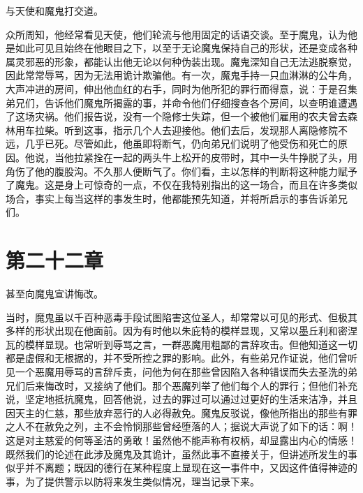 与天使和魔鬼打交道。\par

众所周知，他经常看见天使，他们轮流与他用固定的话语交谈。至于魔鬼，认为他是如此可见且始终在他眼目之下，以至于无论魔鬼保持自己的形状，还是变成各种属灵邪恶的形象，都能认出他无论以何种伪装出现。魔鬼深知自己无法逃脱察觉，因此常常辱骂，因为无法用诡计欺骗他。有一次，魔鬼手持一只血淋淋的公牛角，大声冲进的房间，伸出他血红的右手，同时为他所犯的罪行而得意，说：于是召集弟兄们，告诉他们魔鬼所揭露的事，并命令他们仔细搜查各个房间，以查明谁遭遇了这场灾祸。他们报告说，没有一个隐修士失踪，但一个被他们雇用的农夫曾去森林用车拉柴。听到这事，指示几个人去迎接他。他们去后，发现那人离隐修院不远，几乎已死。尽管如此，他虽即将断气，仍向弟兄们说明了他受伤和死亡的原因。他说，当他拉紧拴在一起的两头牛上松开的皮带时，其中一头牛挣脱了头，用角伤了他的腹股沟。不久那人便断气了。你们看，主以怎样的判断将这种能力赋予了魔鬼。这是身上可惊奇的一点，不仅在我特别指出的这一场合，而且在许多类似场合，事实上每当这样的事发生时，他都能预先知道，并将所启示的事告诉弟兄们。\par


\section{第二十二章}

甚至向魔鬼宣讲悔改。\par

当时，魔鬼虽以千百种恶毒手段试图陷害这位圣人，却常常以可见的形式、但极其多样的形状出现在他面前。因为有时他以朱庇特的模样显现，又常以墨丘利和密涅瓦的模样显现。也常听到辱骂之言，一群恶魔用粗鄙的言辞攻击。但他知道这一切都是虚假和无根据的，并不受所控之罪的影响。此外，有些弟兄作证说，他们曾听见一个恶魔用辱骂的言辞斥责，问他为何在那些曾因陷入各种错误而失去圣洗的弟兄们后来悔改时，又接纳了他们。那个恶魔列举了他们每个人的罪行；但他们补充说，坚定地抵抗魔鬼，回答他说，过去的罪过可以通过过更好的生活来洁净，并且因天主的仁慈，那些放弃恶行的人必得赦免。魔鬼反驳说，像他所指出的那些有罪之人不在赦免之列，主不会怜悯那些曾经堕落的人；据说大声说了如下的话：啊！这是对主慈爱的何等圣洁的勇敢！虽然他不能声称有权柄，却显露出内心的情感！既然我们的论述在此涉及魔鬼及其诡计，虽然此事不直接关于，但讲述所发生的事似乎并不离题；既因的德行在某种程度上显现在这一事件中，又因这件值得神迹的事，为了提供警示以防将来发生类似情况，理当记录下来。\par

